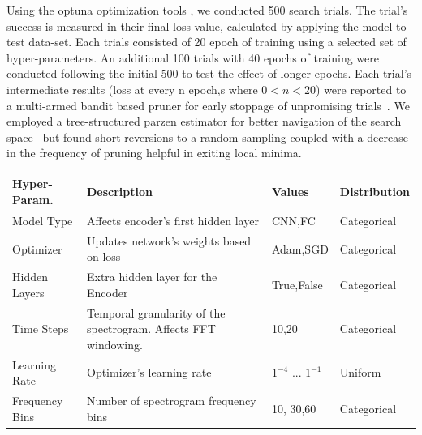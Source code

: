 \documentclass[runningheads,a4paper]{llncs}
\begin{document}
\begin{appendices}
Using the optuna optimization tools \cite{akiba2019optuna}, we conducted 500 search trials. The trial's success is measured in their final loss value, calculated by applying the model to test data-set. Each trials consisted of 20 epoch of training using a selected set of hyper-parameters. An additional 100 trials with 40 epochs of training were conducted following the initial 500 to test the effect of longer epochs. Each trial's intermediate results (loss at every n epoch,s where $0<n<20$) were reported to a multi-armed bandit based pruner for early stoppage of unpromising trials~\cite{li2017hyperband}. We employed a tree-structured parzen estimator for better navigation of the search space~\cite{bergstra2011algorithms,akiba2019optuna} but found short reversions to a random sampling coupled with a decrease in the frequency of pruning helpful in exiting local minima. \\
\begin{table}[htbp]
\begin{tabular}{|p{28mm}|p{50mm}|p{21mm}|p{21mm}|}
\hline
Hyper-Param. & Description  & Values & Distribution\\ \hline
Model Type      &   Affects encoder's first hidden layer & CNN,FC & Categorical \\  \hline
Optimizer       & Updates network's weights based on loss & Adam,SGD & Categorical  \\  \hline
Hidden Layers   & Extra hidden layer for the Encoder & True,False & Categorical \\  \hline
Time Steps & Temporal granularity of the spectrogram. Affects FFT windowing. & 10,20 & Categorical  \\ \hline
Learning Rate   &    Optimizer's learning rate  & $1^{-4}$ ... $1^{-1}$ & Uniform      \\ \hline
Frequency Bins & Number of spectrogram frequency bins & 10, 30,60 & Categorical \\ \hline


\end{tabular}
\end{table}
\end{appendices}
\end{document}

